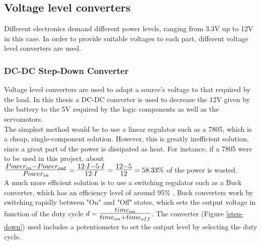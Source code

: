 	











\subsection{Voltage level converters}	

Different electronics demand different power levels, ranging from 3.3V up to 12V in this case. In order to provide suitable voltages to each part, different voltage level converters are used.

	\subsubsection{DC-DC Step-Down Converter}

		Voltage level converters are used to adapt a source's voltage to that required by the load. In this thesis a DC-DC converter is used to decrease the 12V given by the battery to the 5V required by the logic components as well as the servomotors. \\
		
		The simplest method would be to use a linear regulator such as a 7805, which is a cheap, single-component solution. However, this is greatly inefficient solution, since a great part of the power is dissipated as heat.
		For instance, if a 7805 were to be used in this project, about $\mbox{\Large $\frac{Power_{in} - Power_{out} }{Power_{in} }$}=\mbox{\Large $\frac{12 \cdot I -5 \cdot I}{12\cdot I}$}=\mbox{\Large $\frac{12-5}{12}$}=58.33\%$ of the power is wasted.\\


		A much more efficient solution is to use a switching regulator such as a Buck converter, which has an efficiency level of around 95\%  \cite{buck}. 
		Buck converters work by switching rapidly between "On" and "Off" states, which sets the output voltage in function of the duty cycle $d=\mbox{\Large $\frac{time_{on}}{time_{on}+time_{off}}$}$. The converter (Figure \ref{step-down}) used includes a potentiometer to set the output level by selecting the duty cycle. 
 
		

